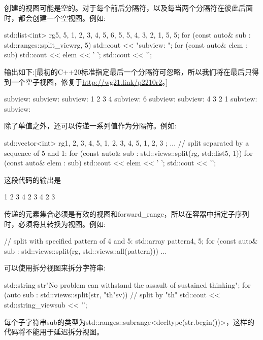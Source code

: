创建的视图可能是空的。对于每个前后分隔符，以及每当两个分隔符在彼此后面时，都会创建一个空视图。例如:

\begin{cpp}
std::list<int> rg{5, 5, 1, 2, 3, 4, 5, 6, 5, 5, 4, 3, 2, 1, 5, 5};
for (const auto& sub : std::ranges::split_view{rg, 5}) {
	std::cout << "subview: ";
	for (const auto& elem : sub) {
		std::cout << elem << ' ';
	}
	std::cout << '\n';
}
\end{cpp}

输出如下:[最初的C++20标准指定最后一个分隔符可忽略，所以我们将在最后只得到一个空子视图，修复于\url{http://wg21.link/p2210r2}。]

\begin{shell}
subview:
subview:
subview: 1 2 3 4
subview: 6
subview:
subview: 4 3 2 1
subview:
subview:
\end{shell}

除了单值之外，还可以传递一系列值作为分隔符。例如:

\begin{cpp}
std::vector<int> rg{1, 2, 3, 4, 5, 1, 2, 3, 4, 5, 1, 2, 3 };
...
// split separated by a sequence of 5 and 1:
for (const auto& sub : std::views::split(rg, std::list{5, 1})) {
	for (const auto& elem : sub) {
		std::cout << elem << ' ';
	}
	std::cout << '\n';
}
\end{cpp}

这段代码的输出是

\begin{shell}
1 2 3 4
2 3 4
2 3
\end{shell}

传递的元素集合必须是有效的视图和forward\_range，所以在容器中指定子序列时，必须将其转换为视图。例如:

\begin{cpp}
// split with specified pattern of 4 and 5:
std::array pattern{4, 5};
for (const auto& sub : std::views::split(rg, std::views::all(pattern))) {
	...
}
\end{cpp}

可以使用拆分视图来拆分字符串:

\begin{cpp}
std::string str{"No problem can withstand the assault of sustained thinking"};
for (auto sub : std::views::split(str, "th"sv)) { // split by "th"
	std::cout << std::string_view{sub} << '\n';
}
\end{cpp}

每个子字符串sub的类型为std::ranges::subrange<decltype(str.begin())>，这样的代码将不能用于延迟拆分视图。

